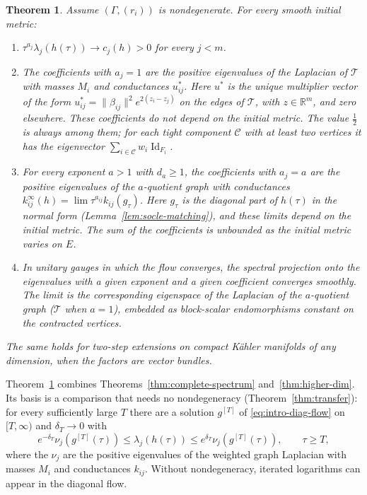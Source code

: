 \documentclass[11pt]{amsart}
\newtheorem{theorem}{Theorem}[section]
\theoremstyle{definition}
\theoremstyle{remark}
\newcommand{\id}{\operatorname{Id}}
\begin{document}
\begin{theorem}\label{thm:intro-main}
Assume $(\Gamma,(r_i))$ is nondegenerate. For every smooth initial metric:
\begin{enumerate}
\item $\tau^{a_j}\lambda_j(h(\tau))\to c_j(h)>0$ for every $j<m$.
\item The coefficients with $a_j=1$ are the positive eigenvalues of the
 Laplacian of $\mathcal T$ with masses $M_i$ and conductances $u^*_{ij}$.
 Here $u^*$ is the unique multiplier vector of the form
 $u^*_{ij}=\lVert\beta_{ij}\rVert^2e^{2(z_i-z_j)}$ on the edges of
 $\mathcal T$, with $z\in\mathbb R^m$, and zero elsewhere. These coefficients do
 not depend on the initial metric. The value $\frac12$ is always among
 them; for each tight component $\mathcal C$ with at least two vertices it
 has the eigenvector $\sum_{i\in\mathcal C}w_i\id_{F_i}$.
\item For every exponent $a>1$ with $d_a\ge1$, the coefficients with
 $a_j=a$ are the positive eigenvalues of the $a$-quotient graph with
 conductances $k^\infty_{ij}(h)=\lim\tau^{a_{ij}}k_{ij}(g_\tau)$. Here
 $g_\tau$ is the diagonal part of $h(\tau)$ in the normal form
 (Lemma~\ref{lem:socle-matching}), and these limits depend on the initial
 metric. The sum of the coefficients is unbounded as the initial metric
 varies on $E$.
\item In unitary gauges in which the flow converges, the spectral
 projection onto the eigenvalues with a given exponent and a given
 coefficient converges smoothly. The limit is the corresponding eigenspace
 of the Laplacian of the $a$-quotient graph ($\mathcal T$ when $a=1$),
 embedded as block-scalar endomorphisms constant on the contracted
 vertices.
\end{enumerate}
The same holds for two-step extensions on compact K\"ahler manifolds of any
dimension, when the factors are vector bundles.
\end{theorem}

Theorem~\ref{thm:intro-main} combines Theorems~\ref{thm:complete-spectrum}
and~\ref{thm:higher-dim}. Its basis is a comparison that needs no
nondegeneracy (Theorem~\ref{thm:transfer}): for every sufficiently large
$T$ there are a solution $g^{[T]}$ of \eqref{eq:intro-diag-flow} on
$[T,\infty)$ and $\delta_T\to0$ with
\[
 e^{-\delta_T}\nu_j(g^{[T]}(\tau))\le\lambda_j(h(\tau))\le
 e^{\delta_T}\nu_j(g^{[T]}(\tau)),\qquad\tau\ge T,
\]
where the $\nu_j$ are the positive eigenvalues of the weighted graph
Laplacian with masses $M_i$ and conductances $k_{ij}$. Without
nondegeneracy, iterated logarithms can appear in the diagonal flow.
\end{document}
